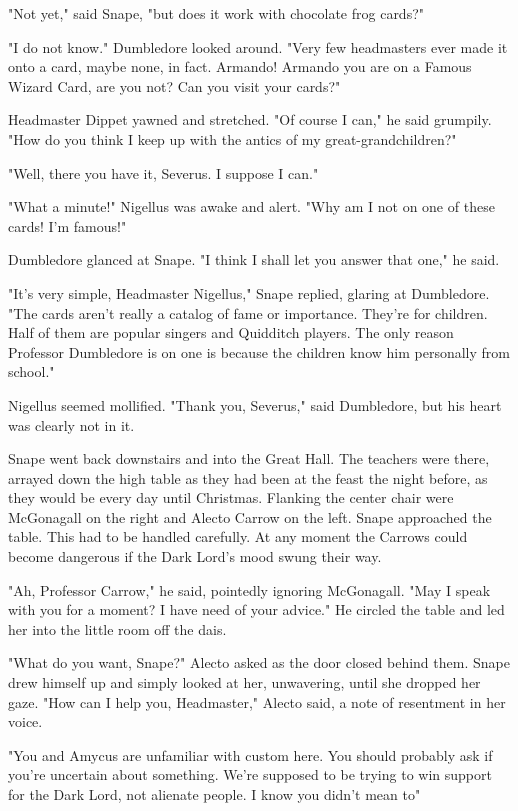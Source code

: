 "Not yet," said Snape, "but does it work with chocolate frog cards?"

"I do not know." Dumbledore looked around. "Very few headmasters ever made it onto a card, maybe none, in fact. Armando! Armando you are on a Famous Wizard Card, are you not? Can you visit your cards?"

Headmaster Dippet yawned and stretched. "Of course I can," he said grumpily. "How do you think I keep up with the antics of my great-grandchildren?"

"Well, there you have it, Severus. I suppose I can."

"What a minute!" Nigellus was awake and alert. "Why am I not on one of these cards! I'm famous!"

Dumbledore glanced at Snape. "I think I shall let you answer that one," he said.

"It's very simple, Headmaster Nigellus," Snape replied, glaring at Dumbledore. "The cards aren't really a catalog of fame or importance. They're for children. Half of them are popular singers and Quidditch players. The only reason Professor Dumbledore is on one is because the children know him personally from school."

Nigellus seemed mollified. "Thank you, Severus," said Dumbledore, but his heart was clearly not in it.

Snape went back downstairs and into the Great Hall. The teachers were there, arrayed down the high table as they had been at the feast the night before, as they would be every day until Christmas. Flanking the center chair were McGonagall on the right and Alecto Carrow on the left. Snape approached the table. This had to be handled carefully. At any moment the Carrows could become dangerous if the Dark Lord's mood swung their way.

"Ah, Professor Carrow," he said, pointedly ignoring McGonagall. "May I speak with you for a moment? I have need of your advice." He circled the table and led her into the little room off the dais.

"What do you want, Snape?" Alecto asked as the door closed behind them. Snape drew himself up and simply looked at her, unwavering, until she dropped her gaze. "How can I help you, Headmaster," Alecto said, a note of resentment in her voice.

"You and Amycus are unfamiliar with custom here. You should probably ask if you're uncertain about something. We're supposed to be trying to win support for the Dark Lord, not alienate people. I know you didn't mean to{\el}"

